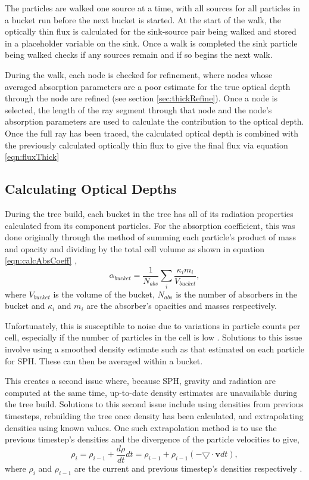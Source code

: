 The particles are walked one source at a time, with all sources for all particles in a bucket run before the next bucket is started. At the start of the walk, the optically thin flux is calculated for the sink-source pair being walked and stored in a placeholder variable on the sink. Once a walk is completed the sink particle being walked checks if any sources remain and if so begins the next walk.

During the walk, each node is checked for refinement, where nodes whose averaged absorption parameters are a poor estimate for the true optical depth through the node are refined (see section \ref{sec:thickRefine}). Once a node is selected, the length of the ray segment through that node and the node's absorption parameters are used to calculate the contribution to the optical depth. Once the full ray has been traced, the calculated optical depth is combined with the previously calculated optically thin flux to give the final flux via equation \ref{eqn:fluxThick}

\subsection{Calculating Optical Depths}
During the tree build, each bucket in the tree has all of its radiation properties calculated from its component particles. For the absorption coefficient, this was done originally through the method of summing each particle's product of mass and opacity and dividing by the total cell volume as shown in equation \ref{eqn:calcAbsCoeff} \citep{rory},
\begin{equation}
    \alpha_{bucket} = \frac{1}{N_{abs}}\sum_i{\frac{\kappa_i m_i}{V_{bucket}}},
    \label{eqn:calcAbsCoeff}
\end{equation}
where $V_{bucket}$ is the volume of the bucket, $N_{abs}$ is the number of absorbers in the bucket and $\kappa_i$ and $m_i$ are the absorber's opacities and masses respectively.

Unfortunately, this is susceptible to noise due to variations in particle counts per cell, especially if the number of particles in the cell is low . Solutions to this issue involve using a smoothed density estimate such as that estimated on each particle for SPH. These can then be averaged within a bucket. 

This creates a second issue where, because SPH, gravity and radiation are computed at the same time, up-to-date density estimates are unavailable during the tree build. Solutions to this second issue include using densities from previous timesteps, rebuilding the tree once density has been calculated, and extrapolating densities using known values. One such extrapolation method is to use the previous timestep's densities and the divergence of the particle velocities to give,
\begin{equation}
    \rho_i = \rho_{i-1} + \frac{d\rho}{dt}dt = \rho_{i-1} + \rho_{i-1} (-\bm{\bigtriangledown \cdot v} dt),
\end{equation}
where $\rho_i$ and $\rho_{i-1}$ are the current and previous timestep's densities respectively \citep{divV}.

